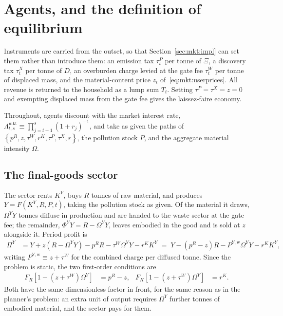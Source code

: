 \section{Agents, and the definition of equilibrium}\label{sec:mkt:eq}

Instruments are carried from the outset, so that Section~\ref{sec:mkt:impl} can set them rather than introduce them: an emission tax $\tau^P_t$ per tonne of $\Xi$, a discovery tax $\tau^X_t$ per tonne of $D$, an overburden charge levied at the gate fee $\tau^W_t$ per tonne of displaced mass, and the material-content price $z_t$ of~\eqref{eq:mkt:userprices}. All revenue is returned to the household as a lump sum $T_t$. Setting $\tau^P=\tau^X=z=0$ and exempting displaced mass from the gate fee gives the laissez-faire economy.

Throughout, agents discount with the market interest rate, $\Lambda^{\mathrm{mkt}}_{t,s}\equiv\prod_{j=t+1}^{s}\left(1+r_j\right)^{-1}$, and take as given the paths of $\left\{p^R,z,\tau^W,r^K,\tau^P,\tau^X,r\right\}$, the pollution stock $P$, and the aggregate material intensity $\Omega$.

\subsection{The final-goods sector}\label{sec:mkt:eq:goods}

The sector rents $K^Y$, buys $R$ tonnes of raw material, and produces $Y=F\left(K^Y,R,P,t\right)$, taking the pollution stock as given. Of the material it draws, $\Omega^YY$ tonnes diffuse in production and are handed to the waste sector at the gate fee; the remainder, $\Phi^YY=R-\Omega^YY$, leaves embodied in the good and is sold at $z$ alongside it. Period profit is
\begin{align}
\Pi^Y &= Y+z\left(R-\Omega^YY\right)-p^RR-\tau^W\Omega^YY-r^KK^Y
\;=\; Y-\left(p^R-z\right)R-P^{Y,\mathrm{w}}\Omega^YY-r^KK^Y,
\label{eq:mkt:profitY}
\end{align}
writing $P^{Y,\mathrm{w}}\equiv z+\tau^W$ for the combined charge per diffused tonne. Since the problem is static, the two first-order conditions are
\begin{align}
F_R\left[1-\left(z+\tau^W\right)\Omega^Y\right] &= p^R-z,
&
F_K\left[1-\left(z+\tau^W\right)\Omega^Y\right] &= r^K .
\label{eq:mkt:focY}
\end{align}
Both have the same dimensionless factor in front, for the same reason as in the planner's problem: an extra unit of output requires $\Omega^Y$ further tonnes of embodied material, and the sector pays for them.

